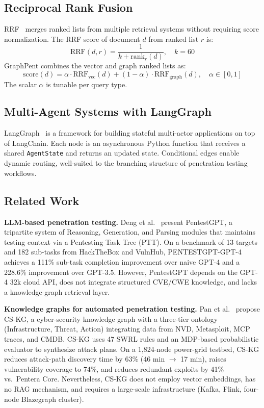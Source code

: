 \documentclass[conference]{IEEEtran}
\begin{document}
\subsection{Reciprocal Rank Fusion}

RRF~\cite{cormack2009rrf} merges ranked lists from multiple retrieval systems
without requiring score normalization.
The RRF score of document $d$ from ranked list $r$ is:
\begin{equation}
  \mathrm{RRF}(d, r) = \frac{1}{k + \mathrm{rank}_r(d)}, \quad k = 60
  \label{eq:rrf_base}
\end{equation}
GraphPent combines the vector and graph ranked lists as:
\begin{equation}
  \mathrm{score}(d) = \alpha \cdot \mathrm{RRF}_{\mathrm{vec}}(d)
                    + (1-\alpha) \cdot \mathrm{RRF}_{\mathrm{graph}}(d),
  \quad \alpha \in [0,1]
  \label{eq:rrf_combined}
\end{equation}
The scalar $\alpha$ is tunable per query type.

\subsection{Multi-Agent Systems with LangGraph}

LangGraph~\cite{langgraph2024} is a framework for building stateful multi-actor
applications on top of LangChain.
Each node is an asynchronous Python function that receives a shared
\texttt{AgentState} and returns an updated state.
Conditional edges enable dynamic routing, well-suited to the branching
structure of penetration testing workflows.

\subsection{Related Work}

\textbf{LLM-based penetration testing.}
Deng et al.~\cite{deng2024pentestgpt} present PentestGPT, a tripartite system
of Reasoning, Generation, and Parsing modules that maintains testing context
via a Pentesting Task Tree (PTT).
On a benchmark of 13 targets and 182 sub-tasks from HackTheBox and VulnHub,
PENTESTGPT-GPT-4 achieves a 111\% sub-task completion improvement over
naive GPT-4 and a 228.6\% improvement over GPT-3.5.
However, PentestGPT depends on the GPT-4 32k cloud API, does not integrate
structured CVE/CWE knowledge, and lacks a knowledge-graph retrieval layer.

\textbf{Knowledge graphs for automated penetration testing.}
Pan et al.~\cite{pan2025cskg} propose CS-KG, a cyber-security knowledge graph
with a three-tier ontology (Infrastructure, Threat, Action) integrating data
from NVD, Metasploit, MCP traces, and CMDB.
CS-KG uses 47 SWRL rules and an MDP-based probabilistic evaluator to synthesize
attack plans.
On a 1,824-node power-grid testbed, CS-KG reduces attack-path discovery time
by 63\% (46 min $\to$ 17 min), raises vulnerability coverage to 74\%, and
reduces redundant exploits by 41\% vs.\ Pentera Core.
Nevertheless, CS-KG does not employ vector embeddings, has no RAG mechanism,
and requires a large-scale infrastructure (Kafka, Flink, four-node Blazegraph
cluster).
\end{document}
